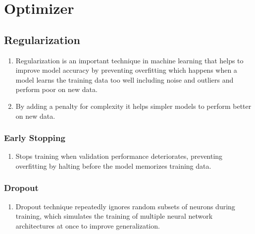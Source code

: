 \chapter{  Optimizer}



\section{Regularization}

\begin{enumerate}
    \item Regularization is an important technique in machine learning that helps to improve model accuracy by preventing overfitting which happens when a model learns the training data too well including noise and outliers and perform poor on new data. 
    \hfill \cite{geeksforgeeks/machine-learning/regularization-in-machine-learning}
    
    \item By adding a penalty for complexity it helps simpler models to perform better on new data.
    \hfill \cite{geeksforgeeks/machine-learning/regularization-in-machine-learning}
\end{enumerate}




\subsection{Early Stopping}

\begin{enumerate}
    \item Stops training when validation performance deteriorates, preventing overfitting by halting before the model memorizes training data.
    \hfill \cite{wiki/Regularization_mathematics}
\end{enumerate}





\subsection{Dropout}

\begin{enumerate}
    \item Dropout technique repeatedly ignores random subsets of neurons during training, which simulates the training of multiple neural network architectures at once to improve generalization.
    \hfill \cite{wiki/Regularization_mathematics}
\end{enumerate}





